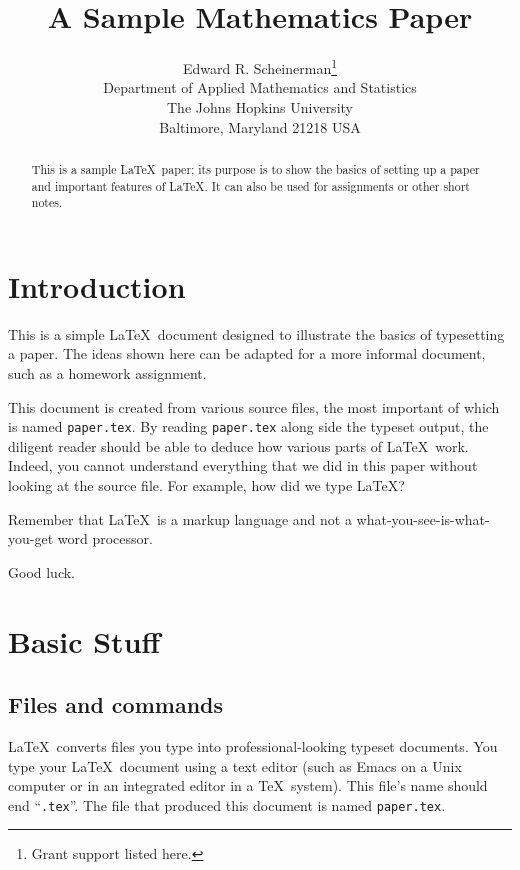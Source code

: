 \documentclass[12pt]{article}
\begin{document}
\nocite{*}

\title{A Sample Mathematics Paper}

\author{Edward R. Scheinerman\thanks{Grant support listed here.} \\ 
Department of Applied Mathematics and Statistics \\
The Johns Hopkins University \\
Baltimore, Maryland 21218 USA}

\maketitle

\begin{abstract}
  This is a sample \LaTeX\ paper; its purpose is to show the basics of
  setting up a paper and important features of \LaTeX. It can also be
  used for assignments or other short notes.
\end{abstract}


\section{Introduction}

This is a simple \LaTeX\ document designed to illustrate the basics of
typesetting a paper. The ideas shown here can be adapted for
a more informal document, such as a homework assignment. 

This document is created from various source files, the most important
of which is named \verb|paper.tex|. By reading \verb|paper.tex| along
side the typeset output, the diligent reader should be able to deduce
how various parts of \LaTeX\ work. Indeed, you cannot understand
everything that we did in this paper without looking at the source
file. For example, how did we type \LaTeX?

Remember that \LaTeX\ is a markup language and not a
what-you-see-is-what-you-get word processor. 

Good luck.

\section{Basic Stuff}
\label{sect:basics}


\subsection{Files and commands}

\LaTeX\ converts files you type into professional-looking typeset
documents. You type your \LaTeX\ document using a text editor (such as
Emacs on a Unix computer or in an integrated editor in a \TeX\
system). This file's name should end ``\verb|.tex|''. The file that
produced this document is named \verb|paper.tex|.
\end{document}
